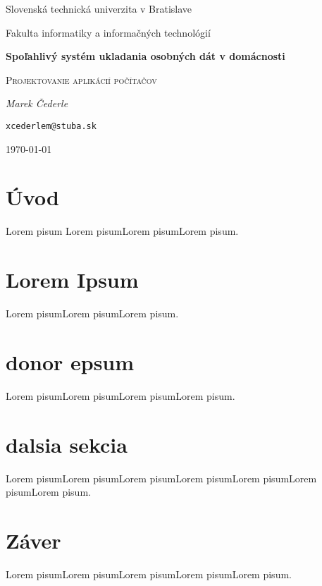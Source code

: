 \documentclass[12pt,oneside,slovak,a4paper]{article}
\begin{document}

\begin{titlepage}
	\centering
    {\Large Slovenská technická univerzita v Bratislave\par}
    {\Large Fakulta informatiky a informačných technológií\par}
	\vspace{7cm}
	{\huge\bfseries Spoľahlivý systém ukladania osobných dát v domácnosti\par}
	\vspace{0.5cm}
    {\Large \textsc{Projektovanie aplikácií počítačov}\par}
    \vspace{1cm}
	{\Large\itshape Marek Čederle\par}
    {\small\texttt{xcederlem@stuba.sk}\par}
	\vfill

	{\large \today\par}
\end{titlepage}

\begin{abstract}
    Cieľom môjho projektu bude zamerať sa, akým spôsobom si môže bežný človek sprevádzkovať spoľahlivý systém na ukladanie, prípadne zálohovanie dát. Bude sa jednať o návrh a sprevádzkovanie dátového servera (NAS) v domácnosti, ktorý sa bude skladať z bežných počítačových komponentov a jeho zapojenia v počítačovej sieti vrátane potrebnej kabeláže. Neoddeliteľnou súčasťou môjho projektu bude vhodný výber SW riešenia, ktoré bude na tomto HW ``bežať''. Taktiež pôjde o jeho umiestnenie v domácnosti vzhľadom na hlučnosť tohto systému. Na záver by som chcel porovnať cenu s konkurencieschopným komerčným riešením.
\end{abstract}

\tableofcontents

\section{Úvod}
Lorem pisum\cite{TEST} Lorem pisumLorem pisumLorem pisum.

\section{Lorem Ipsum}
Lorem pisumLorem pisumLorem pisum.

\section{donor epsum}
Lorem pisumLorem pisumLorem pisumLorem pisum.

\section{dalsia sekcia}
Lorem pisumLorem pisumLorem pisumLorem pisumLorem pisumLorem pisumLorem pisum.

\section{Záver}
Lorem pisumLorem pisumLorem pisumLorem pisumLorem pisum.



\end{document}

